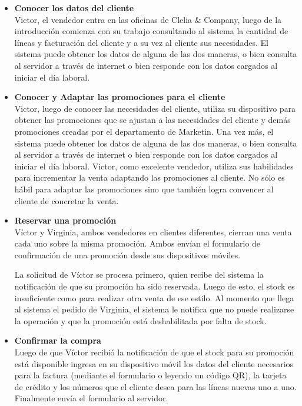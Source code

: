 \begin{itemize}
  \item \textbf{Conocer los datos del cliente} \\
    Victor, el vendedor entra en las oficinas de Clelia \& Company, luego de la introducción comienza con su trabajo consultando al sistema la cantidad de líneas y facturación del cliente y a su vez al cliente sus necesidades. El sistema puede obtener los datos de alguna de las dos maneras, o bien consulta al servidor a través de internet o bien responde con los datos cargados al iniciar el día laboral.

  \item \textbf{Conocer y Adaptar las promociones para el cliente} \\
    Victor, luego de conocer las necesidades del cliente, utiliza su dispositivo para obtener las promociones que se ajustan a las necesidades del cliente y demás promociones creadas por el departamento de Marketin. Una vez más, el sistema puede obtener los datos de alguna de las dos maneras, o bien consulta al servidor a través de internet o bien responde con los datos cargados al iniciar el día laboral. Victor, como excelente vendedor, utiliza sus habilidades para incrementar la venta adaptando las promociones al cliente.
    No sólo es hábil para adaptar las promociones sino que también logra convencer al cliente de concretar la venta.

  \item \textbf{Reservar una promoción} \\
    Víctor y Virginia, ambos vendedores en clientes diferentes, cierran una venta cada uno sobre la misma
    promoción. Ambos envían el formulario de confirmación de una promoción desde sus dispositivos móviles.

    La solicitud de Víctor se procesa primero, quien recibe del sistema la
    notificación de que su promoción ha sido reservada. Luego de esto, el stock
    es insuficiente como para realizar otra venta de ese estilo. Al momento que
    llega al sistema el pedido de Virginia, el sistema le notifica que no puede
    realizarse la operación y que la promoción está deshabilitada por falta de
    stock.

  \item \textbf{Confirmar la compra} \\
    Luego de que Víctor recibió la notificación de que el stock para su 
    promoción está disponible ingresa en su dispositivo móvil los datos del cliente necesarios para la factura (mediante el formulario o leyendo un código 
    QR), la tarjeta de crédito y los números que el cliente desea para las líneas nuevas uno a uno. 
    Finalmente envía el formulario al servidor.
\end{itemize}


